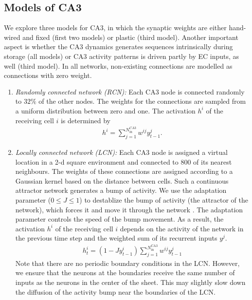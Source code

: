\documentclass[utf8]{frontiersSCNS} %
\begin{document}
\subsection{Models of CA3}
\label{ca3:models}

We explore three models for CA3, in which the synaptic weights are either hand-wired and fixed (first two models) or plastic (third model). 
%
Another important aspect is whether the CA3 dynamics generates sequences intrinsically during storage (all models) or CA3 activity patterns is driven partly by EC inputs, as well (third model). 
%
In all networks, non-existing connections are modelled as connections with zero weight.
%
\begin{enumerate}
\item \textit{Randomly connected network (RCN):} Each CA3 node is connected randomly to $32\%$ of the other nodes. The weights for the connections are sampled from a uniform distribution between zero and one. The activation $h^i$ of the receiving cell $i$ is determined by
%
\begin{align}
	\label{activationRCN}
	h^i = \sum_{j=1}^{N^{CA3}_\mathrm{in}} w^{ij}y^{j}_{t-1}.
\end{align}  
%
\item \textit{Locally connected network (LCN):} Each CA3 node is assigned a virtual location in a 2-d square environment and connected to $800$ of its nearest neighbours. The weights of these connections are assigned according to a Gaussian kernel based on the distance between cells. 
Such a continuous attractor network generates a bump of activity. We use the adaptation parameter ($0 \leq J \leq 1$) to destablize the bump of activity (the attractor of the network), which forces it and move it through the network \citep{azizi2013computational}. The adaptation parameter controls the speed of the bump movement. 
As a result, the activation $h^i$ of the receiving cell $i$ depends on the activity of the network in the previous time step and the weighted sum of its recurrent inputs $y^j$.
%
\begin{align}
\label{activationLCN}
h^{i}_{t} = (1 - J y^{i}_{t-1}) \sum_{j = 1}^{N^\mathrm{CA3}_\mathrm{in}} {{w^{ij} y^{j}_{t-1}}}
\end{align}
%
Note that there are no periodic boundary conditions in the LCN. However, we ensure that the neurons at the boundaries receive the same number of inputs as the neurons in the center of the sheet. This may slightly slow down the diffusion of the activity bump near the boundaries of the LCN.


\end{enumerate}
\end{document}
